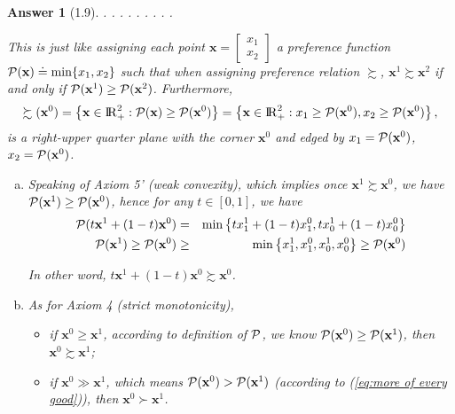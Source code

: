 \documentclass{article}
\newtheorem*{ans}{Answer}
\newcommand {\Reals}  {{\rm I \! R}}
\newcommand{\1}{{\bf 1}}
\newcommand{\0}{{\mathbf{0}}}
\newcommand{\x}{{\mathbf{x}}}
\newcommand{\cP}{{\cal P}}
\newcommand{\<}{\langle}
\renewcommand{\>}{\rangle}
\begin{document}
\begin{ans}[1.9]
	
	\noindent.\newline 
	.\newline
	.\newline
	.\newline
	.\newline
	.\newline
	.\newline
	.\newline
	.\newline
	
This is just like assigning each point $\x = \begin{bmatrix}
x_1 \\ x_2
\end{bmatrix}$ a preference function $\cP(\x) \doteq \min \{x_1, x_2\}$ such that when assigning preference relation $\succsim$, $\x^1 \succsim \x^2$ if and only if $\cP(\x^1) \ge \cP(\x^2)$. Furthermore, 
\begin{equation}
\succsim (\x^0 ) = \left\{ \x \in \Reals_+^2:  \cP(\x ) \ge \cP(\x^0) \right\} = \left\{ \x \in \Reals_+^2:   x_1\ge  \cP (\x^0 ),  x_2\ge \cP (\x^0 ) \right\}, \label{eq:more of every good}
\end{equation}
is a right-upper quarter plane with the corner $\x^0$ and edged by $x_1= \cP (\x^0 ) $, $x_2 = \cP (\x^0 )$.

\begin{enumerate}[(a)]
	\item Speaking of Axiom 5' (weak convexity), 
 which implies once $\x^1 \succsim \x^0$, we have $\cP(\x^1) \ge \cP(\x^0)$, hence for any $t \in [0,1]$, we have 
 \begin{eqnarray*}
 	\cP(t \x^1 + (1-t) \x^0) & = & \min \left\{ tx^1_1 +(1-t)x^0_1 , tx^1_0 +(1-t)x^0_0\right\} \\
\cP(\x^1 ) \ge \cP(\x^0) 	& \ge & \min \left\{ x^1_1 , x^0_1 , x^1_0 , x^0_0\right\} \ge \cP (\x^0)
 \end{eqnarray*}


In other word, $ t \x^1 + (1-t)\x^0 \succsim  \x^0  $.
	\item As for Axiom 4 (strict monotonicity), 
	\begin{itemize}
		\item if $\x^0 \ge \x^1$, according to definition of $\cP$, we know $\cP(\x^0 ) \ge \cP(\x^1)$, then $\x^0 \succsim \x^1$;
		\item if $\x^0 \gg \x^1$, which means $\cP(\x^0 ) > \cP(\x^1)$ (according to (\ref{eq:more of every good})), then $\x^0 \succ\x^1$. 
	\end{itemize}


\end{enumerate}
\end{ans}
\end{document}
